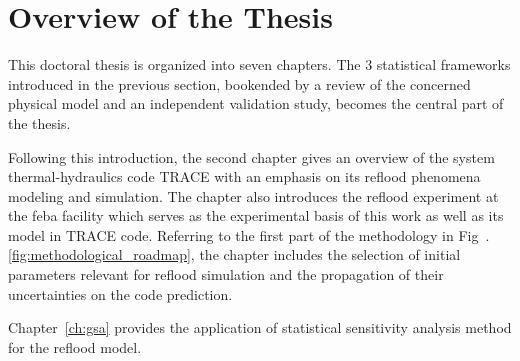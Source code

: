 \section{Overview of the Thesis}\label{sec:intro_overview}

This doctoral thesis is organized into seven chapters.
The $3$ statistical frameworks introduced in the previous section, 
bookended by a review of the concerned physical model and an independent validation study, 
becomes the central part of the thesis.

Following this introduction, 
the second chapter gives an overview of the system thermal-hydraulics code TRACE with an emphasis on its reflood phenomena modeling and simulation.
The chapter also introduces the reflood experiment at the \gls{feba} facility which serves as the experimental basis of this work
as well as its model in TRACE code.
Referring to the first part of the methodology in Fig~.\ref{fig:methodological_roadmap}, 
the chapter includes the selection of initial parameters relevant for reflood simulation and the propagation of their uncertainties on the code prediction.

Chapter~\ref{ch:gsa} provides the application of statistical sensitivity analysis method for the reflood model.
